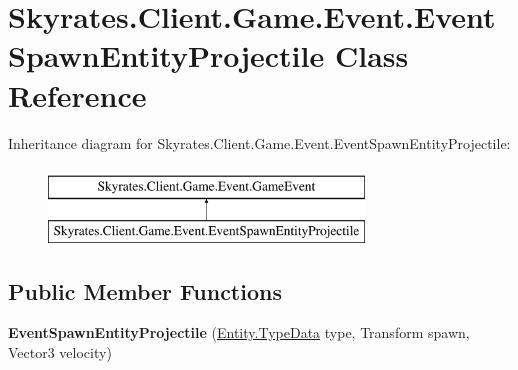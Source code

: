 \hypertarget{class_skyrates_1_1_client_1_1_game_1_1_event_1_1_event_spawn_entity_projectile}{\section{Skyrates.\-Client.\-Game.\-Event.\-Event\-Spawn\-Entity\-Projectile Class Reference}
\label{class_skyrates_1_1_client_1_1_game_1_1_event_1_1_event_spawn_entity_projectile}
}
Inheritance diagram for Skyrates.\-Client.\-Game.\-Event.\-Event\-Spawn\-Entity\-Projectile\-:\begin{figure}[H]
\begin{center}
\leavevmode
\includegraphics[height=2.000000cm]{class_skyrates_1_1_client_1_1_game_1_1_event_1_1_event_spawn_entity_projectile}
\end{center}
\end{figure}
\subsection*{Public Member Functions}
\begin{DoxyCompactItemize}
\item 
\hypertarget{class_skyrates_1_1_client_1_1_game_1_1_event_1_1_event_spawn_entity_projectile_ad546a867bfe62cdc1e04cff1a591543f}{{\bfseries Event\-Spawn\-Entity\-Projectile} (\hyperlink{class_skyrates_1_1_common_1_1_entity_1_1_entity_1_1_type_data}{Entity.\-Type\-Data} type, Transform spawn, Vector3 velocity)}\label{class_skyrates_1_1_client_1_1_game_1_1_event_1_1_event_spawn_entity_projectile_ad546a867bfe62cdc1e04cff1a591543f}

\end{DoxyCompactItemize}
